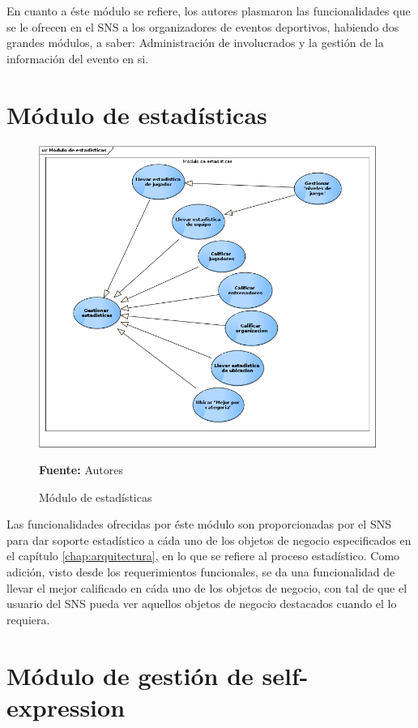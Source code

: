 En cuanto a éste módulo se refiere, los autores plasmaron las funcionalidades que se le ofrecen en el SNS a los organizadores de eventos deportivos, habiendo dos grandes módulos, a saber: Administración de involucrados y la gestión de la información del evento en si.

\section{Módulo de estadísticas}

\begin{figure}[!htb]
  \begin{center}
    \includegraphics[width=11cm]{./imagenes/casos_uso/gestion_estadisticas.png}
    \caption{Módulo de estadísticas}
    \label{fig:cu_estad}
    \textbf{Fuente:} Autores
  \end{center}
\end{figure}

Las funcionalidades ofrecidas por éste módulo son proporcionadas por el SNS para dar soporte estadístico a cáda uno de los objetos de negocio especificados en el capítulo \ref{chap:arquitectura}, en lo que se refiere al proceso estadístico. Como adición, visto desde los requerimientos funcionales, se da una funcionalidad de llevar el mejor calificado en cáda uno de los objetos de negocio, con tal de que el usuario del SNS pueda ver aquellos objetos de negocio destacados cuando el lo requiera.

\clearpage

\section{Módulo de gestión de self-expression}

